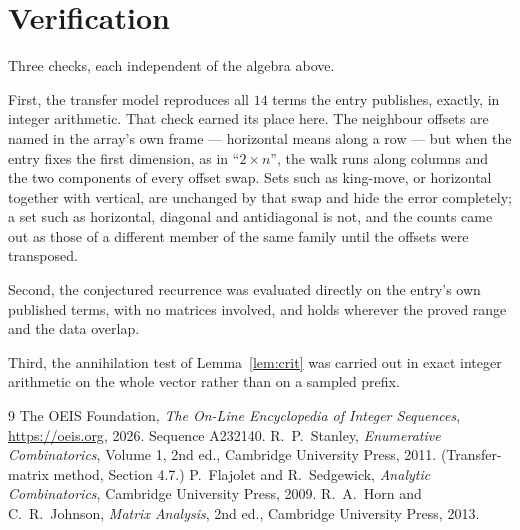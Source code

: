 \documentclass[11pt,a4paper]{article}
\theoremstyle{plain}
\theoremstyle{definition}
\begin{document}
\section{Verification}

Three checks, each independent of the algebra above.

First, the transfer model reproduces all $14$ terms the entry publishes, exactly, in
integer arithmetic. That check earned its place here. The neighbour offsets are named in the
array's own frame --- horizontal means along a row --- but when the entry fixes the first
dimension, as in ``$2\times n$'', the walk runs along columns and the two components of every
offset swap. Sets such as king-move, or horizontal together with vertical, are unchanged by
that swap and hide the error completely; a set such as horizontal, diagonal and antidiagonal
is not, and the counts came out as those of a different member of the same family until the
offsets were transposed.

Second, the conjectured recurrence was evaluated directly on the entry's own published terms,
with no matrices involved, and holds wherever the proved range and the data overlap.

Third, the annihilation test of Lemma~\ref{lem:crit} was carried out in exact integer
arithmetic on the whole vector rather than on a sampled prefix.

\begin{thebibliography}{9}
 The OEIS Foundation, \emph{The On-Line Encyclopedia of Integer
Sequences}, \url{https://oeis.org}, 2026. Sequence A232140.
 R.~P.~Stanley, \emph{Enumerative Combinatorics}, Volume 1, 2nd ed.,
Cambridge University Press, 2011. (Transfer-matrix method, Section 4.7.)
 P.~Flajolet and R.~Sedgewick, \emph{Analytic Combinatorics}, Cambridge
University Press, 2009.
 R.~A.~Horn and C.~R.~Johnson, \emph{Matrix Analysis}, 2nd ed., Cambridge
University Press, 2013.
\end{thebibliography}
\end{document}
